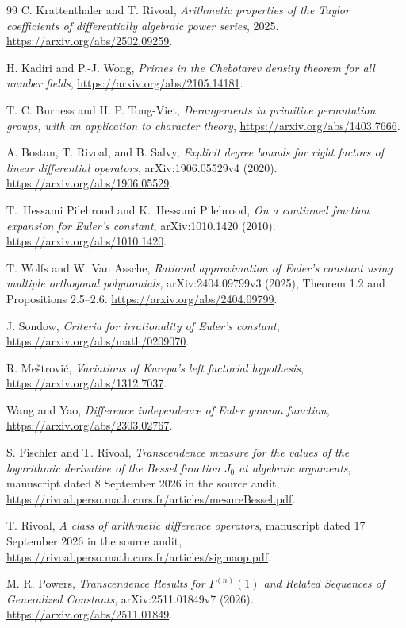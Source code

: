 \documentclass[11pt,a4paper]{article}
\theoremstyle{definition}
\theoremstyle{remark}
\theoremstyle{plain}
\numberwithin{equation}{section}
\begin{document}
\begin{thebibliography}{99}
 C. Krattenthaler and T. Rivoal,
\emph{Arithmetic properties of the Taylor coefficients of
differentially algebraic power series}, 2025.
\url{https://arxiv.org/abs/2502.09259}.

 H. Kadiri and P.-J. Wong,
\emph{Primes in the Chebotarev density theorem for all number fields},
\url{https://arxiv.org/abs/2105.14181}.

 T. C. Burness and H. P. Tong-Viet,
\emph{Derangements in primitive permutation groups, with an application
to character theory}, \url{https://arxiv.org/abs/1403.7666}.

 A. Bostan, T. Rivoal, and B. Salvy, \emph{Explicit degree bounds for right factors of linear differential operators}, arXiv:1906.05529v4 (2020). \url{https://arxiv.org/abs/1906.05529}.

 T.~Hessami Pilehrood and K.~Hessami Pilehrood,
\emph{On a continued fraction expansion for Euler's constant},
arXiv:1010.1420 (2010).
\url{https://arxiv.org/abs/1010.1420}.

 T. Wolfs and W. Van Assche, \emph{Rational approximation of Euler's constant using multiple orthogonal polynomials}, arXiv:2404.09799v3 (2025), Theorem 1.2 and Propositions 2.5--2.6. \url{https://arxiv.org/abs/2404.09799}.

 J. Sondow, \emph{Criteria for irrationality of
Euler's constant}, \url{https://arxiv.org/abs/math/0209070}.

 R. Me\v strovi\'c,
\emph{Variations of Kurepa's left factorial hypothesis},
\url{https://arxiv.org/abs/1312.7037}.

 Wang and Yao,
\emph{Difference independence of Euler gamma function},
\url{https://arxiv.org/abs/2303.02767}.

 S. Fischler and T. Rivoal,
\emph{Transcendence measure for the values of the logarithmic derivative
of the Bessel function $J_0$ at algebraic arguments}, manuscript dated
8 September 2026 in the source audit,
\url{https://rivoal.perso.math.cnrs.fr/articles/mesureBessel.pdf}.

 T. Rivoal,
\emph{A class of arithmetic difference operators}, manuscript dated
17 September 2026 in the source audit,
\url{https://rivoal.perso.math.cnrs.fr/articles/sigmaop.pdf}.

 M. R. Powers, \emph{Transcendence Results for $\Gamma^{(n)}(1)$ and Related Sequences of Generalized Constants}, arXiv:2511.01849v7 (2026). \url{https://arxiv.org/abs/2511.01849}.


\end{thebibliography}
\end{document}
